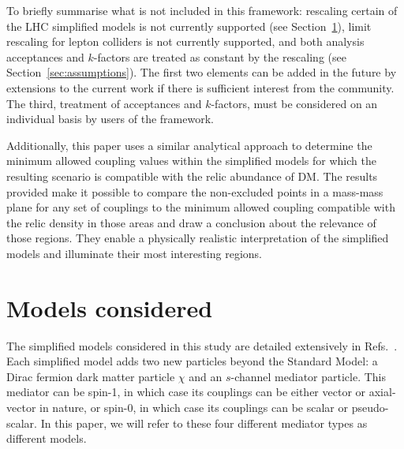 \documentclass[a4paper, 11pt]{article}
\begin{document}
To briefly summarise what is not included in this framework: rescaling certain of the LHC simplified models is not currently supported (see Section~\ref{sec:models}), limit rescaling for lepton colliders is not currently supported, and both analysis acceptances and $k$-factors are treated as constant by the rescaling (see Section~\ref{sec:assumptions}). The first two elements can be added in the future by extensions to the current work if there is sufficient interest from the community. The third, treatment of acceptances and $k$-factors, must be considered on an individual basis by users of the framework.

Additionally, this paper uses a similar analytical approach to determine the minimum allowed coupling values within the simplified models for which the resulting scenario is compatible with the relic abundance of DM. The results provided make it possible to compare the non-excluded points in a mass-mass plane for any set of couplings to the minimum allowed coupling compatible with the relic density in those areas and draw a conclusion about the relevance of those regions. They enable a physically realistic interpretation of the simplified models and illuminate their most interesting regions.

\section{Models considered}
\label{sec:models}

The simplified models considered in this study are detailed extensively in Refs.~\cite{ABERCROMBIE2020100371,ALBERT2019100377}. Each simplified model adds two new particles beyond the Standard Model: a Dirac fermion dark matter particle $\chi$ and an $s$-channel mediator particle. This mediator can be spin-1, in which case its couplings can be either vector or axial-vector in nature, or spin-0, in which case its couplings can be scalar or pseudo-scalar. In this paper, we will refer to these four different mediator types as different models.
\end{document}
